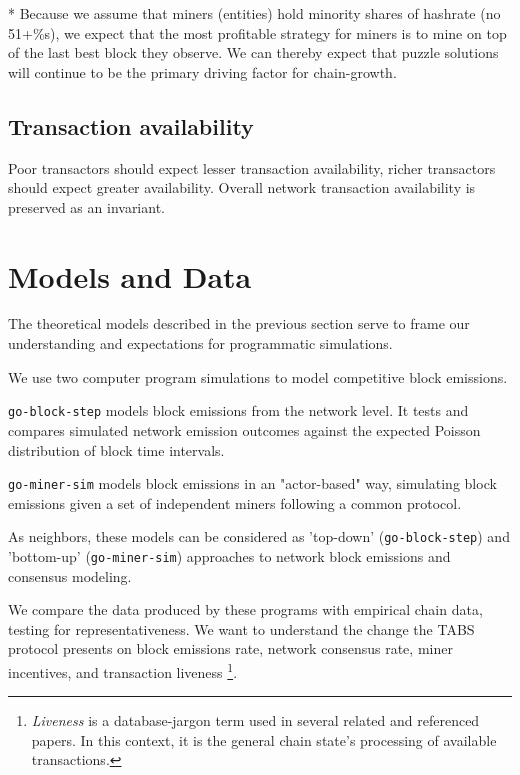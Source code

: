 \documentclass[11pt]{article}
\theoremstyle{plain}
\begin{document}
* Because we assume that miners (entities) hold minority shares of hashrate (no 51+\%s),
we expect that the most profitable strategy for miners is to mine on top of the last best
block they observe.
We can thereby expect that puzzle solutions will continue to be
the primary driving factor for chain-growth.

\subsection{\normalsize{Transaction availability}}

Poor transactors should expect lesser transaction availability,
richer transactors should expect greater availability.
Overall network transaction availability is preserved as an invariant.


\section{\normalsize{Models and Data}}

The theoretical models described in the previous section serve to
frame our understanding and expectations for programmatic simulations.

We use two computer program simulations to model competitive block emissions.

\texttt{go-block-step} models block emissions from the network level.
It tests and compares simulated network emission outcomes
against the expected Poisson distribution of block time intervals.

\texttt{go-miner-sim} models block emissions in an "actor-based" way,
simulating block emissions given a set of independent miners following a common protocol.

As neighbors, these models can be considered as 'top-down' (\texttt{go-block-step}) and 'bottom-up' (\texttt{go-miner-sim})
approaches to network block emissions and consensus modeling.

We compare the data produced by these programs with empirical chain data, testing for representativeness.
We want to understand the change the TABS protocol presents on block emissions rate,
network consensus rate, miner incentives, and transaction liveness\nolinebreak
\footnote{\emph{Liveness} is a database-jargon term used in several related and referenced papers.
In this context, it is the general chain state's processing of available transactions.
}.
\end{document}
